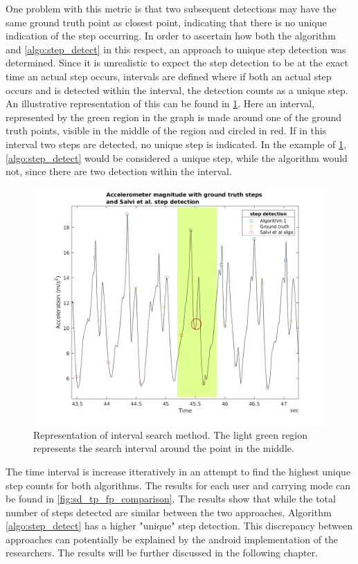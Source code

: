 One problem with this metric is that two subsequent detections may have the same ground truth point as closest point, indicating that there is no unique indication of the step occurring. In order to ascertain how both the \citet{Salvi2018} algorithm and \cref{algo:step_detect} in this respect, an approach to unique step detection was determined. Since it is unrealistic to expect the step detection to be at the exact time an actual step occurs, intervals are defined where if both an actual step occurs and is detected within the interval, the detection counts as a unique step. An illustrative representation of this can be found in \cref{fig:202011121558_true_positive_example_1}. Here an interval, represented by the green region in the graph is made around one of the ground truth points, visible in the middle of the region and circled in red. If in this interval two steps are detected, no unique step is indicated. In the example of  \cref{fig:202011121558_true_positive_example_1},  \cref{algo:step_detect} would be considered a unique step, while the \citet{Salvi2018} algorithm would not, since there are two detection within the interval.

\begin{figure}
	\centering
	\includegraphics[width=0.75\linewidth]{images/20201112_1809_true_positive_example_2}
	\caption{Representation of interval search method. The light green region represents the search interval around the \citet{Salvi2018} point in the middle.}
	\label{fig:202011121558_true_positive_example_1}
\end{figure}

The time interval is increase itteratively in an attempt to find the highest unique step counts for both algorithms. The results for each user and carrying mode can be found in \cref{fig:sd_tp_fp_comparison}. The results show that while the total number of steps detected are similar between the two approaches, Algorithm \ref{algo:step_detect} has a higher "unique" step detection. This discrepancy between approaches can potentially be explained by the android implementation of the researchers. The results will be further discussed in the following chapter. 

